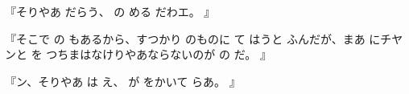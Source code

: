 『そりやあ
だらう、
の
める
だわエ。
』

『そこで
の
もあるから、すつかり
のものに
て
はうと
ふんだが、まあ
にチヤンと
を
つちまはなけりやあならないのが
の
だ。
』

『ン、そりやあ
は
え、
が
をかいて
らあ。
』
